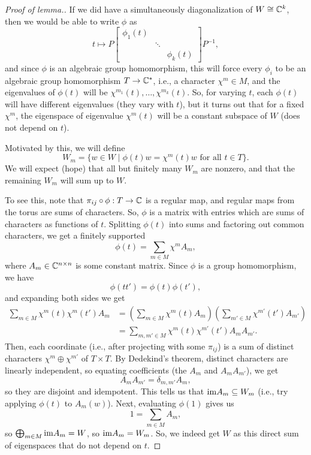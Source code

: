 \documentclass[12pt]{article}
\begin{document}
\begin{proof}[Proof of lemma.]
    If we did have a simultaneously diagonalization of $W\cong \mathbb{C}^k$, then we would be able to write $\phi$ as
    \[t \mapsto P\begin{bmatrix}
        \phi_1(t) & & \\
         & \ddots & \\
         & & \phi_k(t)
    \end{bmatrix}P^{-1},\]
    and since $\phi$ is an algebraic group homomorphism, this will force every $\phi_i$ to be an algebraic group homomorphism $T \to \mathbb{C}^*$, i.e., a character $\chi^m\in M$, and the eigenvalues of $\phi(t)$ will be $\chi^{m_1}(t),\dots,\chi^{m_k}(t)$. So, for varying $t$, each $\phi(t)$ will have different eigenvalues (they vary with $t$), but it turns out that for a fixed $\chi^m$, the eigenspace of eigenvalue $\chi^m(t)$ will be a constant subspace of $W$ (does not depend on $t$).

    Motivated by this, we will define
    \[W_m = \{w\in W \mid \phi(t)w = \chi^m(t)w \text{ for all } t\in T\}.\]
    We will expect (hope) that all but finitely many $W_m$ are nonzero, and that the remaining $W_m$ will sum up to $W$.

    To see this, note that $\pi_{ij}\circ \phi: T \to \C$ is a regular map, and regular maps from the torus are sums of characters. So, $\phi$ is a matrix with entries which are sums of characters as functions of $t$. Splitting $\phi(t)$ into sums and factoring out common characters, we get a finitely supported 
    \[\phi(t) = \sum_{m \in M} \chi^m A_m,\]
    where $A_m \in \mathbb{C}^{n\times n}$ is some constant matrix. Since $\phi$ is a group homomorphism, we have
    \[\phi(tt') = \phi(t)\phi(t'),\]
    and expanding both sides we get
    \begin{align*}
        \sum_{m\in M} \chi^m(t) \chi^m(t') A_m &= \left(\sum_{m\in M} \chi^m(t) A_m\right)\left(\sum_{m'\in M} \chi^{m'}(t') A_{m'}\right)\\
        &= \sum_{m,m'\in M} \chi^m(t) \chi^{m'}(t') A_m A_{m'}.
    \end{align*}
    Then, each coordinate (i.e., after projecting with some $\pi_{ij}$) is a sum of distinct characters $\chi^m \oplus \chi^{m'}$ of $T\times T$. By Dedekind's theorem, distinct characters are linearly independent, so equating coefficients (the $A_m$ and $A_m A_{m'}$), we get
    \[A_m A_{m'} = \delta_{m,m'} A_m,\]
    so they are disjoint and idempotent. This tells us that $\mathrm{im} A_m \subseteq W_m$ (i.e., try applying $\phi(t)$ to $A_m(w)$). Next, evaluating $\phi(1)$ gives us
    \[1 = \sum_{m\in M} A_m,\]
    so $\bigoplus_{m\in M} \mathrm{im} A_m = W$, so $\mathrm{im} A_m = W_m$. So, we indeed get $W$ as this direct sum of eigenspaces that do not depend on $t$.
\end{proof}
\end{document}
